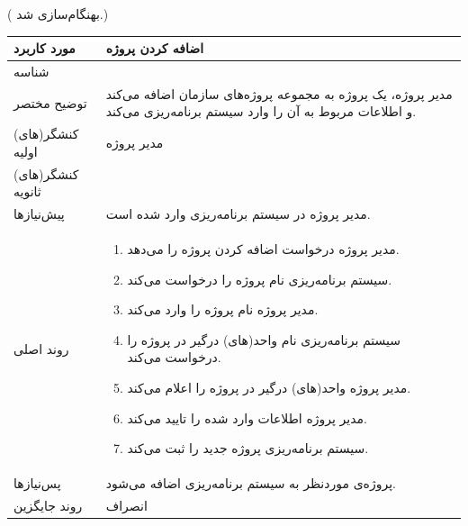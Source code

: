 ({\color{red} بهنگام‌سازی شد.})
\begin{table}[H]
	\centering
	\begin{tabular}{|p{3cm}|p{10cm}|}
		\hline
		
		
		مورد کاربرد	& اضافه کردن پروژه  \\
		\hline
		
		شناسه & 
		\stepcounter{usecase_ID}
		
		\arabic{usecase_ID} \\
		
		\hline
		
		توضیح مختصر & مدیر پروژه، یک پروژه به مجموعه پروژه‌های سازمان اضافه می‌کند و اطلاعات مربوط به آن را وارد سیستم برنامه‌ریزی می‌کند. \\
		\hline
		
		کنشگر(های) اولیه & مدیر پروژه \\
		\hline
		
		کنشگر(های) ثانویه&  \\
		\hline
		
		پیش‌نیازها &
		مدیر پروژه در سیستم برنامه‌ریزی وارد شده است.\\
		\hline
		
		
		روند اصلی &
		\begin{enumerate}[topsep=0cm,leftmargin=0.5cm]
			\item مدیر پروژه درخواست اضافه کردن پروژه را می‌دهد.
			\item سیستم برنامه‌ریزی نام پروژه را درخواست می‌کند.
			\item مدیر پروژه نام پروژه را وارد می‌کند. 
			\item سیستم برنامه‌ریزی نام واحد(های) درگیر در پروژه را درخواست می‌کند. 
			\item مدیر پروژه واحد(های) درگیر در پروژه را اعلام می‌کند. 
			\item  مدیر پروژه اطلاعات وارد شده را تایید می‌کند. 
			\item سیستم برنامه‌ریزی پروژه جدید را ثبت می‌کند.
		\end{enumerate} \\
		
		\hline
		
		پس‌نیازها &
		پروژه‌ی موردنظر به سیستم برنامه‌ریزی اضافه می‌شود. \\
		\hline
		
		روند جایگزین & انصراف \\
		\hline
		
	\end{tabular}
\end{table}


